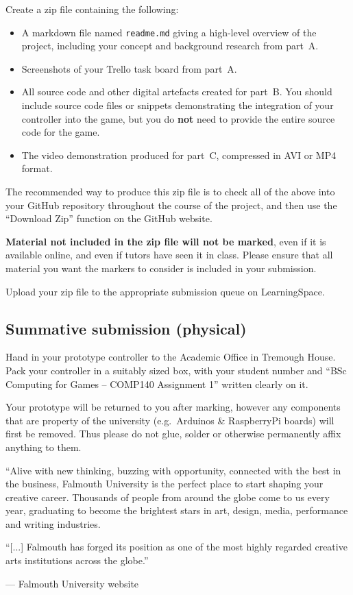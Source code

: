 \documentclass{../fal_assignment}
\begin{document}
Create a zip file containing the following:

\begin{itemize}
\item A markdown file named \texttt{readme.md} giving a high-level overview of the project,
    including your concept and background research from part~A.
\item Screenshots of your Trello task board from part~A.
\item All source code and other digital artefacts created for part~B.
    You should include source code files or snippets demonstrating the integration of your controller into the game,
    but you do \textbf{not} need to provide the entire source code for the game.
\item The video demonstration produced for part~C, compressed in AVI or MP4 format.
\end{itemize}

The recommended way to produce this zip file is to check all of the above into your GitHub repository
throughout the course of the project,
and then use the ``Download Zip'' function on the GitHub website.

\textbf{Material not included in the zip file will not be marked},
even if it is available online, and even if tutors have seen it in class.
Please ensure that all material you want the markers to consider is included in your submission.

Upload your zip file to the appropriate submission queue on LearningSpace.

\subsection*{Summative submission (physical)}

Hand in your prototype controller to the Academic Office in Tremough House.
Pack your controller in a suitably sized box, with your student number
and ``BSc Computing for Games -- COMP140 Assignment 1'' written clearly on it.

Your prototype will be returned to you after marking,
however any components that are property of the university (e.g.\ Arduinos \& RaspberryPi boards)
will first be removed.
Thus please do not glue, solder or otherwise permanently affix anything to them.

\begin{marginquote}
    ``Alive with new thinking, buzzing with opportunity, connected with the best in the business,
    Falmouth University is the perfect place to start shaping your creative career.
    Thousands of people from around the globe come to us every year,
    graduating to become the brightest stars in art, design, media, performance and writing industries.

    ``[...]
    Falmouth has forged its position as one of the most highly regarded creative arts institutions across the globe.''
    
    --- Falmouth University website
\end{marginquote}
\end{document}
